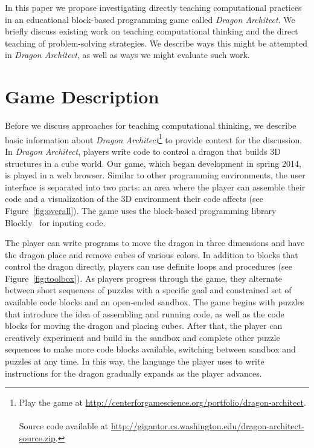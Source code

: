 \documentclass{sig-alternate}
\begin{document}
In this paper we propose investigating directly teaching computational practices in an educational block-based programming game called \emph{Dragon Architect}. 
We briefly discuss existing work on teaching computational thinking and the direct teaching of problem-solving strategies. 
We describe ways this might be attempted in \emph{Dragon Architect}, as well as ways we might evaluate such work. 

\section{Game Description}

Before we discuss approaches for teaching computational thinking, we describe basic information about \emph{Dragon Architect}\footnote{Play the game at \url{http://centerforgamescience.org/portfolio/dragon-architect}.\\\\Source code available at \url{http://gigantor.cs.washington.edu/dragon-architect-source.zip}.} to provide context for the discussion.
In \emph{Dragon Architect}, players write code to control a dragon that builds 3D structures in a cube world.
Our game, which began development in spring 2014, is played in a web browser.
Similar to other programming environments, the user interface is separated into two parts: an area where the player can assemble their code and a visualization of the 3D environment their code affects (see Figure~\ref{fig:overall}). 
The game uses the block-based programming library Blockly~\cite{blockly} for inputing code.

The player can write programs to move the dragon in three dimensions and have the dragon place and remove cubes of various colors. 
In addition to blocks that control the dragon directly, players can use definite loops and procedures (see Figure~\ref{fig:toolbox}).
As players progress through the game, they alternate between short sequences of puzzles with a specific goal and constrained set of available code blocks and an open-ended sandbox.
The game begins with puzzles that introduce the idea of assembling and running code, as well as the code blocks for moving the dragon and placing cubes.
After that, the player can creatively experiment and build in the sandbox and complete other puzzle sequences to make more code blocks available, switching between sandbox and puzzles at any time. 
In this way, the language the player uses to write instructions for the dragon gradually expands as the player advances.
\end{document}
